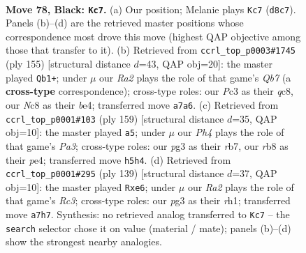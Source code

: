 \documentclass[11pt]{article}
\begin{document}
\clearpage

\begin{figure}[p]\centering
\begin{subfigure}{0.46\textwidth}\centering
\resizebox{\linewidth}{!}{%
\newchessgame
\chessboard[
  setfen={1Rnk4/r7/P1P5/7p/8/2pBK1PP/2P5/8 b - - 2 78},
  showmover=false,
  pgfstyle=straightmove, color=movearrow, markmove={d8-c7}
]}
\caption{}
\end{subfigure}\hfill
\begin{subfigure}{0.46\textwidth}\centering
\resizebox{\linewidth}{!}{%
\newchessgame
\chessboard[
  setfen={2Q5/4r3/1P1p3k/3P3P/p3Bp2/P4P2/1q6/4K3 b - - 6 78},
  showmover=false,
  pgfstyle=straightmove, color=movearrow, markmove={b2-b1}
]}
\caption{}
\end{subfigure}
\\[4pt]
\begin{subfigure}{0.46\textwidth}\centering
\resizebox{\linewidth}{!}{%
\newchessgame
\chessboard[
  setfen={5k2/1R6/p4p2/5B1p/P3Pb2/1P4rP/8/7K b - - 0 80},
  showmover=false,
  pgfstyle=straightmove, color=movearrow, markmove={a6-a5}
]}
\caption{}
\end{subfigure}\hfill
\begin{subfigure}{0.46\textwidth}\centering
\resizebox{\linewidth}{!}{%
\newchessgame
\chessboard[
  setfen={4r2k/1R2n3/2r1Pp1p/7P/5P2/4P3/4BK2/7R b - - 4 70},
  showmover=false,
  pgfstyle=straightmove, color=movearrow, markmove={c6-e6}
]}
\caption{}
\end{subfigure}
\caption{\textbf{Move 78, Black: \texttt{Kc7}.} (a) Our position; Melanie plays \texttt{Kc7} (\texttt{d8c7}). Panels (b)--(d) are the retrieved master positions whose correspondence most drove this move (highest QAP objective among those that transfer to it). (b) Retrieved from \texttt{ccrl\_top\_p0003\#1745} (ply 155) [structural distance $d$=43, QAP obj=20]: the master played \texttt{Qb1+}; under $\mu$ our \emph{Ra2} plays the role of that game's \emph{Qb7} (a \textbf{cross-type} correspondence); cross-type roles: our \emph{P}c3 as their \emph{q}c8, our \emph{N}c8 as their \emph{b}e4; transferred move \texttt{a7a6}. (c) Retrieved from \texttt{ccrl\_top\_p0001\#103} (ply 159) [structural distance $d$=35, QAP obj=10]: the master played \texttt{a5}; under $\mu$ our \emph{Ph4} plays the role of that game's \emph{Pa3}; cross-type roles: our \emph{p}g3 as their \emph{r}b7, our \emph{r}b8 as their \emph{p}e4; transferred move \texttt{h5h4}. (d) Retrieved from \texttt{ccrl\_top\_p0001\#295} (ply 139) [structural distance $d$=37, QAP obj=10]: the master played \texttt{Rxe6}; under $\mu$ our \emph{Ra2} plays the role of that game's \emph{Rc3}; cross-type roles: our \emph{p}g3 as their \emph{r}h1; transferred move \texttt{a7h7}. Synthesis: no retrieved analog transferred to \texttt{Kc7} -- the \texttt{search} selector chose it on value (material / mate); panels (b)--(d) show the strongest nearby analogies.}
\label{fig:thought-m155}
\end{figure}
\end{document}
